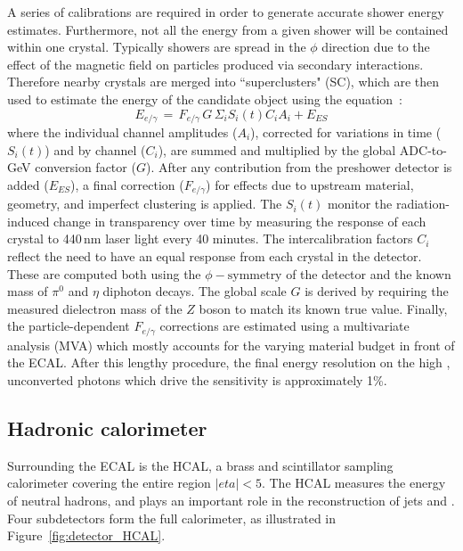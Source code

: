 A series of calibrations are required in order to generate accurate shower energy estimates.
Furthermore, not all the energy from a given shower will be contained within one crystal.
Typically showers are spread in the $\phi$ direction due to the effect of the magnetic field on particles produced via secondary interactions.
Therefore nearby crystals are merged into ``superclusters" (SC), 
which are then used to estimate the energy of the candidate object using the equation~\cite{ECALperformance}:
\begin{equation}
E_{e/\gamma}\, =\, F_{e/\gamma}\, G\, \Sigma_i S_i (t) C_i A_i + E_{ES}
\label{eq:}
\end{equation}
where the individual channel amplitudes ($A_i$), corrected for variations in time ($S_i (t)$) and by channel ($C_i$), 
are summed and multiplied by the global ADC-to-GeV conversion factor ($G$).
After any contribution from the preshower detector is added ($E_{ES}$), 
a final correction ($F_{e/\gamma}$) for effects due to upstream material, geometry, and imperfect clustering is applied. 
The $S_i (t)$ monitor the radiation-induced change in transparency over time by measuring the response of each crystal to 440\,nm laser light every 40 minutes. %
The intercalibration factors $C_i$ reflect the need to have an equal response from each crystal in the detector.
These are computed both using the $\phi-\textrm{symmetry}$ of the detector and the known mass of $\pi^{0}$ and $\eta$ diphoton decays.
The global scale $G$ is derived by requiring the measured dielectron mass of the $Z$ boson to match its known true value.
Finally, the particle-dependent $F_{e/\gamma}$ corrections are estimated using a multivariate analysis (MVA) which mostly accounts for the varying material budget in front of the ECAL.
After this lengthy procedure, the final energy resolution on the high \pt, unconverted photons which drive the \Hgg sensitivity is approximately 1\%.

\subsection{Hadronic calorimeter}

Surrounding the ECAL is the HCAL, a brass and scintillator sampling calorimeter covering the entire region $|eta|<5$.
The HCAL measures the energy of neutral hadrons, and plays an important role in the reconstruction of jets and \met.
Four subdetectors form the full calorimeter, as illustrated in Figure~\ref{fig:detector_HCAL}.

